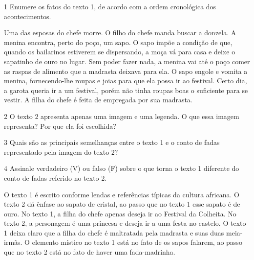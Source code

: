 \num{1} Enumere os fatos do texto 1, de acordo com a ordem cronológica
dos acontecimentos.

\begin{boxlist}
 Uma das esposas do chefe morre.
 O filho do chefe manda buscar a donzela.
 A menina encontra, perto do poço, um sapo.
 O sapo impõe a condição de que, quando os bailarinos estiverem se
dispersando, a moça vá para casa e deixe o sapatinho de ouro no lugar.
 Sem poder fazer nada, a menina vai até o poço comer as raspas de
alimento que a madrasta deixava para ela.
 O sapo engole e vomita a menina, fornecendo-lhe roupas e joias para
que ela possa ir ao festival.
 Certo dia, a garota queria ir a um festival, porém não tinha roupas
boas o suficiente para se vestir.
 A filha do chefe é feita de empregada por sua madrasta.
\end{boxlist}

\num{2} O texto 2 apresenta apenas uma imagem e uma legenda. O que essa
imagem representa? Por que ela foi escolhida?


\num{3} Quais são as principais semelhanças entre o texto 1 e o conto de
fadas representado pela imagem do texto 2?


\pagebreak
\num{4} Assinale verdadeiro (V) ou falso (F) sobre o que torna o texto 1
diferente do conto de fadas referido no texto 2.

\begin{boxlist}
 O texto 1 é escrito conforme lendas e referências típicas da cultura
africana.
 O texto 2 dá ênfase ao sapato de cristal, ao passo que no texto 1
esse sapato é de ouro.
 No texto 1, a filha do chefe apenas deseja ir ao Festival da
Colheita.
 No texto 2, a personagem é uma princesa e deseja ir a uma festa no
castelo.
 O texto 1 deixa claro que a filha do chefe é maltratada pela
madrasta e suas duas meia-irmãs.
 O elemento místico no texto 1 está no fato de os sapos falarem, ao
passo que no texto 2 está no fato de haver uma fada-madrinha.
\end{boxlist}



